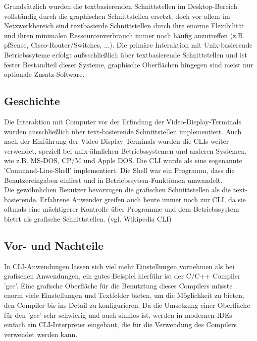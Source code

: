 \documentclass[12pt,a4paper]{report}
\begin{document}
Grundsätzlich wurden die textbasierenden Schnittstellen im Desktop-Bereich vollständig durch die graphischen Schnittstellen ersetzt, doch vor allem im Netzwerkbereich sind textbasierde Schnittstellen durch ihre enorme Flexibilität und ihren minimalen Ressourcenverbrauch immer noch häufig anzutreffen (z.B. pfSense, Cisco-Router/Switches, ...). Die primäre Interaktion mit Unix-basierende Betriebssyteme erfolgt außsschließlich über textbasierende Schnittstellen und ist fester Bestandteil dieser Systeme, graphische Oberflächen hingegen sind meist nur optionale Zusatz-Software.\\

\subsection{Geschichte}

Die Interaktion mit Computer vor der Erfindung der Video-Display-Terminals wurden ausschließlich über text-basierende Schnittstellen implementiert. Auch nach der Einführung der Video-Display-Terminals wurden die CLIs weiter verwendet, speziell bei unix-ähnlichen Betriebssystemen und anderen Systemen, wie z.B. MS-DOS, CP/M und Apple DOS. Die CLI wurde als eine sogenannte 'Command-Line-Shell' implementiert. Die Shell war ein Programm, dass die Benutzereingaben einliest und in Betriebssytem-Funktionen umwandelt.\\
Die gewöhnlichen Benutzer bevorzugen die grafischen Schnittstellen als die text-basierende. Erfahrene Anwender greifen auch heute immer noch zur CLI, da sie oftmals eine mächtigerer Kontrolle über Programme und dem Betriebssystem bietet als grafische Schnittstellen. (vgl. Wikipedia CLI)\\

\subsection{Vor- und Nachteile}

In CLI-Anwendungen lassen sich viel mehr Einstellungen vornehmen als bei grafischen Anwendungen, ein gutes Beispiel hierführ ist der C/C++ Compiler 'gcc'. Eine grafische Oberfläche für die Benutztung dieses Compilers müsste enorm viele Einstellungen und Textfelder bieten, um die Möglichkeit zu bieten, den Compiler bis ins Detail zu konfigurieren. Da die Umsetzung einer Oberfläche für den 'gcc' sehr schwierig und auch sinnlos ist, werden in modernen IDEs einfach ein CLI-Interpreter eingebaut, die für die Verwendung des Compilers verwendet werden kann.\\
\end{document}
